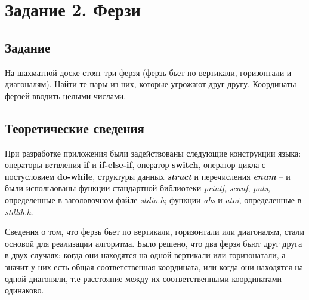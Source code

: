 \documentclass[12pt,a4paper]{report}
\begin{document}
\section{Задание 2. Ферзи}

\subsection{Задание}
\hspace{\parindent}
На шахматной доске стоят три ферзя (ферзь бьет по вертикали, горизонтали и диагоналям). Найти те пары из них, которые угрожают друг другу. Координаты ферзей вводить целыми числами.
\subsection{Теоретические сведения}
\hspace{\parindent}
При разработке приложения были задействованы следующие конструкции языка: операторы ветвления \textbf{if} и \textbf{if-else-if}, оператор \textbf{switch}, оператор цикла с постусловием \textbf{do-while}, структуры данных \textbf{\textit{struct}} и перечисления \textit{\textbf{enum}} -- и были использованы функции стандартной библиотеки \textit{printf}, \textit{scanf}, \textit{puts}, определенные в заголовочном файле \textit{stdio.h}; функции \textit{abs} и \textit{atoi}, определенные в \textit{stdlib.h}.

\hspace{\parindent}
Сведения о том, что ферзь бьет по вертикали, горизонтали или диагоналям, стали основой для реализации алгоритма. Было решено, что два ферзя бьют друг друга в двух случаях: когда они находятся на одной вертикали или горизонатали, а значит у них есть общая соответственная координата, или когда они находятся на одной диагоняли, т.е расстояние между их соответственными координатами одинаково.
\end{document}
